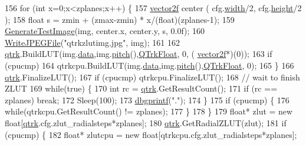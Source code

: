 \begin{DoxyCode}
156         \textcolor{keywordflow}{for} (\textcolor{keywordtype}{int} x=0;x<zplanes;x++)  \{
157             \hyperlink{structvector2}{vector2f} center ( cfg.\hyperlink{struct_q_trk_settings_aef24eb3a4692bd67ff1aca8ef950e08d}{width}/2, cfg.\hyperlink{struct_q_trk_settings_a94c965d103e7a0a4f1fced8eee1324ce}{height}/2 );
158             \textcolor{keywordtype}{float} s = zmin + (zmax-zmin) * x/(\textcolor{keywordtype}{float})(zplanes-1);
159             \hyperlink{utils_8cpp_a2bb752417033483e1acda83da3bc800e}{GenerateTestImage}(img, center.x, center.y, s, 0.0f);
160             \hyperlink{fastjpg_8cpp_a77db3a4044f8f77b5a550b6f05962172}{WriteJPEGFile}(\textcolor{stringliteral}{"qtrkzlutimg.jpg"}, img);
161 
162             \hyperlink{namespaceqtrk}{qtrk}.BuildLUT(img.\hyperlink{struct_t_image_data_a78c7415ecee3965da7e25149cea6f4d8}{data},img.\hyperlink{struct_t_image_data_aef0a87643a69b40e19ba11590d51318d}{pitch}(),\hyperlink{qtrk__c__api_8h_aad82367b3ea592a142bb50a2fb538b0bafeece00bcf1a42419e686ef0cf006a4e}{QTrkFloat}, 0, (
      \hyperlink{structvector2}{vector2f}*)(0));
163             \textcolor{keywordflow}{if} (cpucmp) 
164                 qtrkcpu.BuildLUT(img.\hyperlink{struct_t_image_data_a78c7415ecee3965da7e25149cea6f4d8}{data},img.\hyperlink{struct_t_image_data_aef0a87643a69b40e19ba11590d51318d}{pitch}(),\hyperlink{qtrk__c__api_8h_aad82367b3ea592a142bb50a2fb538b0bafeece00bcf1a42419e686ef0cf006a4e}{QTrkFloat}, 0);
165         \}
166         \hyperlink{namespaceqtrk}{qtrk}.FinalizeLUT();
167         \textcolor{keywordflow}{if} (cpucmp) qtrkcpu.FinalizeLUT();
168         \textcolor{comment}{// wait to finish ZLUT}
169         \textcolor{keywordflow}{while}(\textcolor{keyword}{true}) \{
170             \textcolor{keywordtype}{int} rc = \hyperlink{namespaceqtrk}{qtrk}.GetResultCount();
171             \textcolor{keywordflow}{if} (rc == zplanes) \textcolor{keywordflow}{break};
172             Sleep(100);
173             \hyperlink{utils_8cpp_a4a7132c90e490d24edecb391a754a9c0}{dbgprintf}(\textcolor{stringliteral}{"."});
174         \}
175         \textcolor{keywordflow}{if} (cpucmp) \{
176             \textcolor{keywordflow}{while}(qtrkcpu.GetResultCount() != zplanes);
177         \}
178     \}
179     \textcolor{keywordtype}{float}* zlut = \textcolor{keyword}{new} \textcolor{keywordtype}{float}[\hyperlink{namespaceqtrk}{qtrk}.cfg.zlut\_radialsteps*zplanes];
180     \hyperlink{namespaceqtrk}{qtrk}.GetRadialZLUT(zlut);
181     \textcolor{keywordflow}{if} (cpucmp) \{ 
182         \textcolor{keywordtype}{float}* zlutcpu = \textcolor{keyword}{new} \textcolor{keywordtype}{float}[qtrkcpu.cfg.zlut\_radialsteps*zplanes];

\end{DoxyCode}
